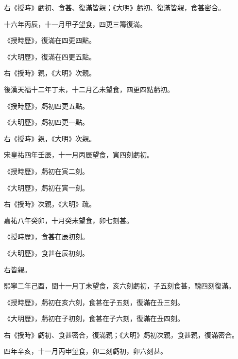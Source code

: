 \begin{pinyinscope}
 右《授時》虧初、食甚、復滿皆親；《大明》虧初、復滿皆親，食甚密合。



 十六年丙辰，十一月甲子望食，四更三籌復滿。



 《授時歷》，復滿在四更四點。



 《大明歷》，復滿在四更五點。



 右《授時》親，《大明》次親。



 後漢天福十二年丁未，十二月乙未望食，四更四點虧初。



 《授時歷》，虧初四更五點。



 《大明歷》，虧初四更一點。



 右《授時》親，《大明》次親。



 宋皇祐四年壬辰，十一月丙辰望食，寅四刻虧初。



 《授時歷》，虧初在寅二刻。



 《大明歷》，虧初在寅一刻。



 右《授時》次親，《大明》疏。



 嘉祐八年癸卯，十月癸未望食，卯七刻甚。



 《授時歷》，食甚在辰初刻。



 《大明歷》，食甚在辰初刻。



 右皆親。



 熙寧二年己酉，閏十一月丁未望食，亥六刻虧初，子五刻食甚，醜四刻復滿。



 《授時歷》，虧初在亥六刻，食甚在子五刻，復滿在丑三刻。



 《大明歷》，虧初在子初刻，食甚在子六刻，復滿在丑四刻。



 右《授時》虧初、食甚密合，復滿親；《大明》虧初次親，食甚親，復滿密合。



 四年辛亥，十一月丙申望食，卯二刻虧初，卯六刻甚。




\end{pinyinscope}
